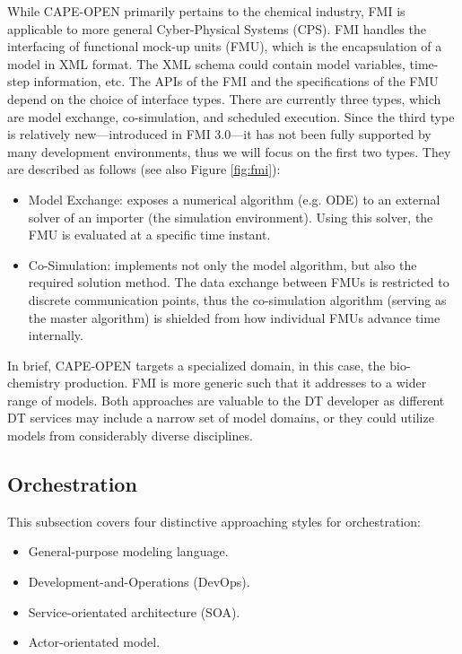 While CAPE-OPEN primarily pertains to the chemical industry, FMI is applicable to more general Cyber-Physical Systems (CPS). FMI handles the interfacing of functional mock-up units (FMU), which is the encapsulation of a model in XML format. The XML schema could contain model variables, time-step information, etc. The APIs of the FMI and the specifications of the FMU depend on the choice of interface types. There are currently three types, which are model exchange, co-simulation, and scheduled execution. Since the third type is relatively new---introduced in FMI 3.0---it has not been fully supported by many development environments, thus we will focus on the first two types. They are described as follows (see also Figure \ref{fig:fmi}): 

\begin{itemize}

  \item Model Exchange: exposes a numerical algorithm (e.g. ODE) to an external solver of an importer (the simulation environment). Using this solver, the FMU is evaluated at a specific time instant.
  
  \item Co-Simulation: implements not only the model algorithm, but also the required solution method. The data exchange between FMUs is restricted to discrete communication points, thus the co-simulation algorithm (serving as the master algorithm) is shielded from how individual FMUs advance time internally.

\end{itemize}

In brief, CAPE-OPEN targets a specialized domain, in this case, the bio-chemistry production. FMI is more generic such that it addresses to a wider range of models. Both approaches are valuable to the DT developer as different DT services may include a narrow set of model domains, or they could utilize models from considerably diverse disciplines.

\subsection{Orchestration} \label{sec:orch}
This subsection covers four distinctive approaching styles for orchestration:
\begin{itemize}

\item General-purpose modeling language.

\item Development-and-Operations (DevOps).

\item Service-orientated architecture (SOA).

\item Actor-orientated model.


\end{itemize}

